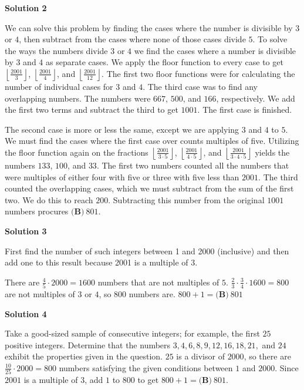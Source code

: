 \begin{enumerate}
 



\textbf{Solution 2}

We can solve this problem by finding the cases where the number is divisible by $3$ or $4$, then subtract from the cases where none of those cases divide $5$. To solve the ways the numbers divide $3$ or $4$ we find the cases where a number is divisible by $3$ and $4$ as separate cases. We apply the floor function to every case to get $\left\lfloor \frac{2001}{3} \right\rfloor$, $\left\lfloor \frac{2001}{4} \right\rfloor$, and $\left\lfloor \frac{2001}{12} \right\rfloor$. The first two floor functions were for calculating the number of individual cases for $3$ and $4$. The third case was to find any overlapping numbers. The numbers were $667$, $500$, and $166$, respectively. We add the first two terms and subtract the third to get $1001$. The first case is finished.

 The second case is more or less the same, except we are applying $3$ and $4$ to $5$. We must find the cases where the first case over counts multiples of five. Utilizing the floor function again on the fractions $\left\lfloor \frac{2001}{3\cdot5} \right\rfloor$, $\left\lfloor \frac{2001}{4\cdot5} \right\rfloor$, and $\left\lfloor \frac{2001}{3\cdot4\cdot5} \right\rfloor$ yields the numbers $133$, $100$, and $33$. The first two numbers counted all the numbers that were multiples of either four with five or three with five less than $2001$. The third counted the overlapping cases, which we must subtract from the sum of the first two. We do this to reach $200$. Subtracting this number from the original $1001$ numbers procures $\boxed{\textbf{(B)}\ 801}$.

 



\textbf{Solution 3}

First find the number of such integers between 1 and 2000 (inclusive) and then add one to this result because 2001 is a multiple of $3$.

 There are $\frac45\cdot2000=1600$ numbers that are not multiples of $5$.  $\frac23\cdot\frac34\cdot1600=800$ are not multiples of $3$ or $4$, so $800$ numbers are.  $800+1=\boxed{\textbf{(B)}\ 801}$




\textbf{Solution 4}

Take a good-sized sample of consecutive integers; for example, the first $25$ positive integers. Determine that the numbers $3, 4, 6, 8, 9, 12, 16, 18, 21,$ and $24$ exhibit the properties given in the question. $25$ is a divisor of $2000$, so there are $\frac{10}{25}\cdot2000=800$ numbers satisfying the given conditions between $1$ and $2000$. Since $2001$ is a multiple of $3$, add $1$ to $800$ to get $800+1=\boxed{\textbf{(B)}\ 801}$.


\end{enumerate}
